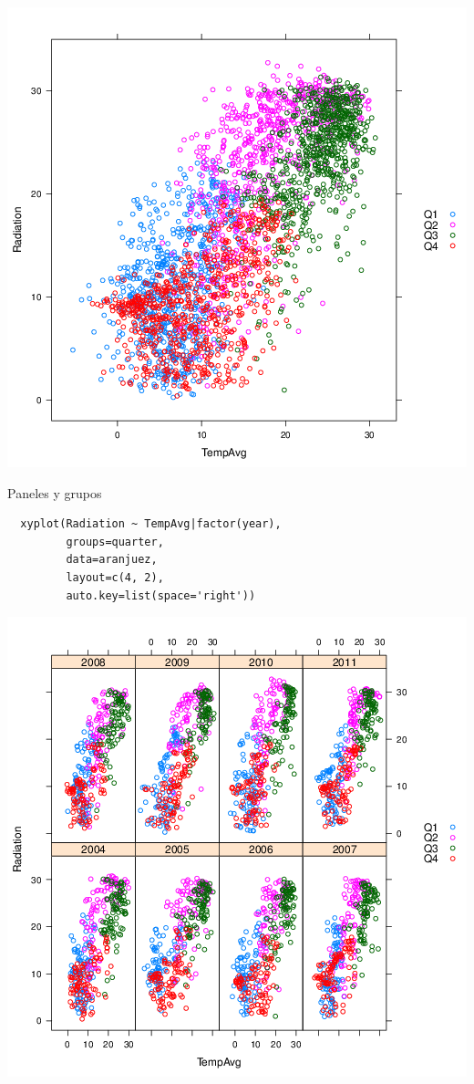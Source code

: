 \documentclass[xcolor={usenames,svgnames,dvipsnames}]{beamer}
\begin{document}
\begin{frame}[label={sec:orgheadline20}]{}
\includegraphics[width=.9\linewidth]{figs/xyplotQuarter.png}
\end{frame}

\begin{frame}[fragile,label={sec:orgheadline21}]{Paneles y grupos}
 \lstset{language=R,label= ,caption= ,captionpos=b,numbers=none}
\begin{lstlisting}
  xyplot(Radiation ~ TempAvg|factor(year),
         groups=quarter,
         data=aranjuez,
         layout=c(4, 2),
         auto.key=list(space='right'))
\end{lstlisting}
\end{frame}

\begin{frame}[label={sec:orgheadline22}]{}
\includegraphics[width=.9\linewidth]{figs/xyplotQuarterYear.png}
\end{frame}
\end{document}
